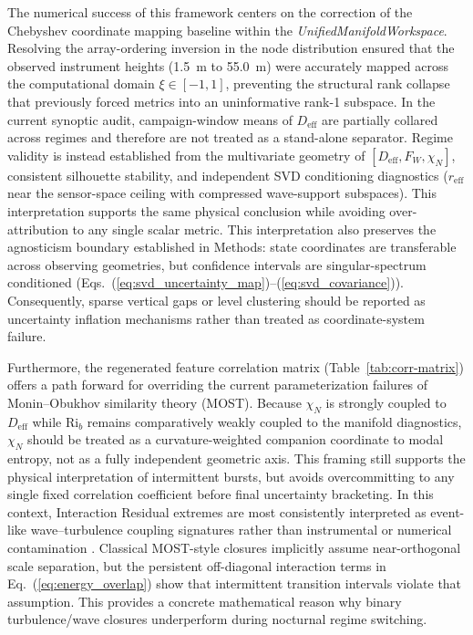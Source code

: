 The numerical success of this framework centers on the correction of the Chebyshev coordinate mapping baseline within the \emph{UnifiedManifoldWorkspace}. Resolving the array-ordering inversion in the node distribution ensured that the observed instrument heights (\SI{1.5}{\meter} to \SI{55.0}{\meter}) were accurately mapped across the computational domain $\xi \in [-1, 1]$, preventing the structural rank collapse that previously forced metrics into an uninformative rank-1 subspace. In the current synoptic audit, campaign-window means of $D_{\mathrm{eff}}$ are partially collared across regimes and therefore are not treated as a stand-alone separator. Regime validity is instead established from the multivariate geometry of $[D_{\mathrm{eff}}, F_W, \chi_N]$, consistent silhouette stability, and independent SVD conditioning diagnostics ($r_{\mathrm{eff}}$ near the sensor-space ceiling with compressed wave-support subspaces). This interpretation supports the same physical conclusion while avoiding over-attribution to any single scalar metric.
This interpretation also preserves the agnosticism boundary established in Methods: state coordinates are transferable across observing geometries, but confidence intervals are singular-spectrum conditioned (Eqs.~(\ref{eq:svd_uncertainty_map})--(\ref{eq:svd_covariance})). Consequently, sparse vertical gaps or level clustering should be reported as uncertainty inflation mechanisms rather than treated as coordinate-system failure.

Furthermore, the regenerated feature correlation matrix (Table~\ref{tab:corr-matrix}) offers a path forward for overriding the current parameterization failures of Monin--Obukhov similarity theory (MOST). Because $\chi_N$ is strongly coupled to $D_{\mathrm{eff}}$ while $\mathrm{Ri}_b$ remains comparatively weakly coupled to the manifold diagnostics, $\chi_N$ should be treated as a curvature-weighted companion coordinate to modal entropy, not as a fully independent geometric axis. This framing still supports the physical interpretation of intermittent bursts, but avoids overcommitting to any single fixed correlation coefficient before final uncertainty bracketing. In this context, Interaction Residual extremes are most consistently interpreted as event-like wave--turbulence coupling signatures rather than instrumental or numerical contamination \citep{Sun2015, Mahrt2010}.
Classical MOST-style closures implicitly assume near-orthogonal scale separation, but the persistent off-diagonal interaction terms in Eq.~(\ref{eq:energy_overlap}) show that intermittent transition intervals violate that assumption. This provides a concrete mathematical reason why binary turbulence/wave closures underperform during nocturnal regime switching.

